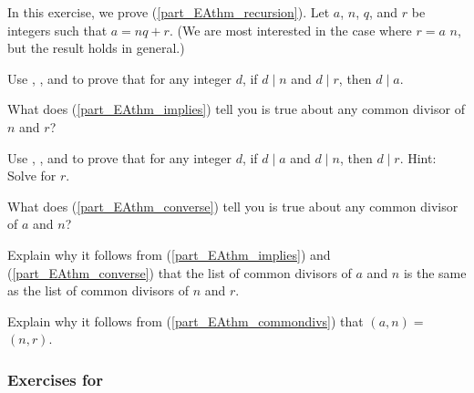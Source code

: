 \begin{exer}[\exerE] %
\label{exer_proof_EAthm_recursion}
    In this exercise, we prove  (\ref{part_EAthm_recursion}).
    Let $a$, $n$, $q$, and $r$ be integers such that $a = nq + r$. (We are most interested in the case where $r = a$  $n$, but the result holds in general.)
        \begin{exerpart}
            \item \label{part_EAthm_implies} Use , , and  to prove that for any integer $d$, if $d \mid n$ and $d \mid r$, then $d \mid a$. 
            \item What does (\ref{part_EAthm_implies}) tell you is true about any common divisor of $n$ and $r$?
            \item \label{part_EAthm_converse} Use , , and  to prove that for any integer $d$, if $d \mid a$ and $d \mid n$, then $d \mid r$. Hint: Solve for $r$.
            \item What does (\ref{part_EAthm_converse}) tell you is true about any common divisor of $a$ and $n$?
            \item \label{part_EAthm_commondivs} Explain why it follows from 
            (\ref{part_EAthm_implies}) and (\ref{part_EAthm_converse})
            that the list of common divisors of $a$ and $n$ is the same as the list of common divisors of $n$ and $r$.
            \item Explain why it follows from (\ref{part_EAthm_commondivs}) that $(a,n) =$  $(n,r)$.  
        \end{exerpart}
\end{exer}


\subsubsection*{Exercises for  \subnegcond}


